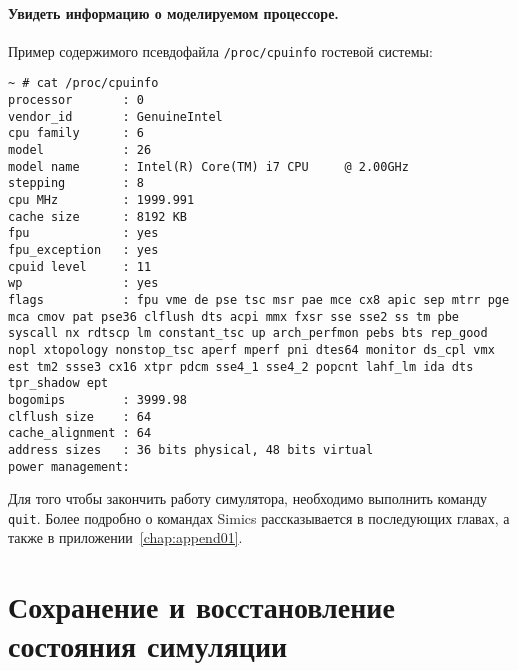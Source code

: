 \paragraph{Увидеть информацию о моделируемом процессоре.} Пример содержимого псевдофайла \texttt{/proc/cpuinfo} гостевой системы:

\begin{lstlisting}
~ # cat /proc/cpuinfo                                                           
processor       : 0                                                             
vendor_id       : GenuineIntel                                                  
cpu family      : 6                                                             
model           : 26                                                            
model name      : Intel(R) Core(TM) i7 CPU     @ 2.00GHz               
stepping        : 8                                                             
cpu MHz         : 1999.991                                                      
cache size      : 8192 KB                                                       
fpu             : yes                                                           
fpu_exception   : yes                                                           
cpuid level     : 11                                                            
wp              : yes                                                           
flags           : fpu vme de pse tsc msr pae mce cx8 apic sep mtrr pge mca cmov pat pse36 clflush dts acpi mmx fxsr sse sse2 ss tm pbe syscall nx rdtscp lm constant_tsc up arch_perfmon pebs bts rep_good nopl xtopology nonstop_tsc aperf mperf pni dtes64 monitor ds_cpl vmx est tm2 ssse3 cx16 xtpr pdcm sse4_1 sse4_2 popcnt lahf_lm ida dts tpr_shadow ept
bogomips        : 3999.98                                                       
clflush size    : 64                                                            
cache_alignment : 64                                                            
address sizes   : 36 bits physical, 48 bits virtual                             
power management:                                                               
\end{lstlisting}

Для того чтобы закончить работу симулятора, необходимо выполнить команду \texttt{quit}. Более подробно о командах Simics рассказывается в последующих главах, а также в приложении~\ref{chap:append01}.

\section{Сохранение и восстановление состояния симуляции}

